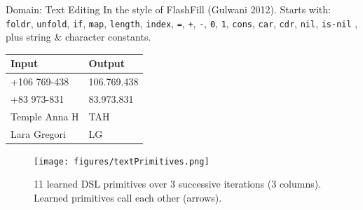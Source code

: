 \documentclass[aspectratio=169,final]{beamer}
\newcommand{\code}[1]{{\texttt{#1}}}
\begin{document}
\begin{frame}{Domain: Text Editing}
  In the style of FlashFill (Gulwani 2012). Starts with: \code{foldr}, \code{unfold}, \code{if}, \code{map}, \code{length},
\code{index}, \code{=}, \code{+}, \code{-}, \code{0}, \code{1}, \code{cons},
\code{car}, \code{cdr}, \code{nil}, \code{is-nil}
, plus string \& character constants.\\

\begin{minipage}[c]{0.4\textwidth}
  \begin{tabular}{ll}
    \toprule
    Input&Output\\\midrule
    +106 769-438&106.769.438\\
    +83 973-831&83.973.831
    \\\midrule
          Temple Anna H&TAH\\
      Lara Gregori&LG
    \\\bottomrule 
    \end{tabular}
  \end{minipage}
\begin{minipage}[c]{0.5\textwidth}
      \begin{figure}        
        \texttt{[image: figures/textPrimitives.png]}\vspace{-0.8cm}
      \caption{11 learned DSL primitives over 3 successive iterations (3 columns). Learned primitives call each other (arrows).}
      \end{figure}  
  \end{minipage}
\end{frame}
\end{document}
